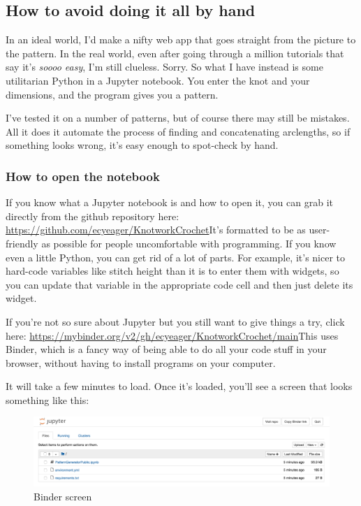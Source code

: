 \documentclass[openany]{book}
\begin{document}
\subsection{How to avoid doing it all by hand}\label{ssec:Python}
In an ideal world, I'd make a nifty web app that goes straight from the picture to the pattern. In the real world, even after going through a million tutorials that say it's \textit{soooo easy}, I'm still clueless. Sorry. So what I have instead is some utilitarian Python in a Jupyter notebook. You enter the knot and your dimensions, and the program gives you a pattern. 

I've tested it on a number of patterns, but of course there may still be mistakes. All it does it automate the process of finding and concatenating arclengths, so if something looks wrong, it's easy enough to spot-check by hand.
\medskip


\subsubsection*{How to open the notebook}
If you know what a Jupyter notebook is and how to open it, you can grab it directly from the github repository here: \url{https://github.com/ecyeager/KnotworkCrochet}\quad It's formatted to be as user-friendly as possible for people uncomfortable with programming. If you know even a little Python, you can get rid of a lot of parts. For example, it's nicer to hard-code variables like stitch height than it is to enter them with widgets, so you can update that variable in the appropriate code cell and then just delete its widget.

If you're not so sure about Jupyter but you still want to give things a try, click here: \url{https://mybinder.org/v2/gh/ecyeager/KnotworkCrochet/main}\quad This uses Binder, which is a fancy way of being able to do all your code stuff in your browser, without having to install programs on your computer.

It will take a few minutes to load. Once it's loaded, you'll see a screen that looks something like this:
\begin{figure}[H]
\includegraphics[width=\textwidth]{pic/binder}
\caption{Binder screen}
\end{figure}
\end{document}
